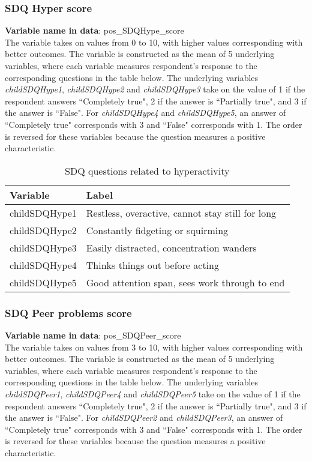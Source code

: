 \subsubsection{SDQ Hyper score}
\textbf{Variable name in data}: pos\_SDQHype\_score \\[.3cm]
The variable takes on values from 0 to 10, with higher values corresponding with better outcomes. The variable is constructed as the mean of 5 underlying variables, where each variable measures respondent's response to the corresponding questions in the table below. The underlying variables \textit{childSDQHype1}, \textit{childSDQHype2} and \textit{childSDQHype3} take on the value of 1 if the respondent answers  ``Completely true", 2 if the answer is ``Partially true", and 3 if the answer is ``False". For \textit{childSDQHype4} and \textit{childSDQHype5}, an answer of ``Completely true" corresponds with 3 and ``False" corresponds with 1. The order is reversed for these variables because the question measures a positive characteristic. \\

\begin{table}[H]
\begin{center}
\footnotesize{
\caption{SDQ questions related to hyperactivity}
\begin{tabular}{l l}
\hline
\textbf{Variable} & \textbf{Label} \\
\hline
childSDQHype1 & Restless, overactive, cannot stay still for long\\
childSDQHype2 & Constantly fidgeting or squirming\\
childSDQHype3 & Easily distracted, concentration wanders\\
childSDQHype4 & Thinks things out before acting \\
childSDQHype5 & Good attention span, sees work through to end\\
\hline
\end{tabular}
}
\end{center}
\end{table}

\subsubsection{SDQ Peer problems score}
\textbf{Variable name in data}: pos\_SDQPeer\_score \\[.3cm]
The variable takes on values from 3 to 10, with higher values corresponding with better outcomes. The variable is constructed as the mean of 5 underlying variables, where each variable measures respondent's response to the corresponding questions in the table below. The underlying variables \textit{childSDQPeer1}, \textit{childSDQPeer4} and \textit{childSDQPeer5} take on the value of 1 if the respondent answers  ``Completely true", 2 if the answer is ``Partially true", and 3 if the answer is ``False". For \textit{childSDQPeer2} and \textit{childSDQPeer3}, an answer of ``Completely true" corresponds with 3 and ``False" corresponds with 1. The order is reversed for these variables because the question measures a positive characteristic. \\

